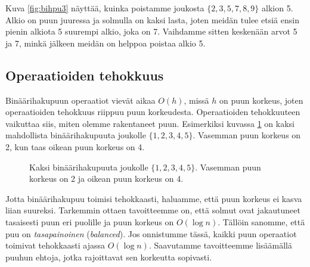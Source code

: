 Kuva \ref{fig:bihpu3} näyttää, kuinka poistamme joukosta $\{2,3,5,7,8,9\}$ alkion 5.
Alkio on puun juuressa ja solmulla on kaksi lasta,
joten meidän tulee etsiä ensin pienin alkiota 5 suurempi alkio,
joka on 7.
Vaihdamme sitten keskenään arvot 5 ja 7,
minkä jälkeen meidän on helppoa poistaa alkio 5.

\subsection{Operaatioiden tehokkuus}

Binäärihakupuun operaatiot vievät aikaa $O(h)$,
missä $h$ on puun korkeus, joten operaatioiden tehokkuus
riippuu puun korkeudesta.
Operaatioiden tehokkuuteen vaikuttaa siis,
miten olemme rakentaneet puun.
Esimerkiksi kuvassa \ref{fig:bihkor} on kaksi mahdollista
binäärihakupuuta joukolle $\{1,2,3,4,5\}$.
Vasemman puun korkeus on 2, kun taas oikean puun korkeus on 4.

\begin{figure}
\center
{}
\caption{Kaksi binäärihakupuuta joukolle $\{1,2,3,4,5\}$.
Vasemman puun korkeus on 2 ja oikean puun korkeus on 4.}
\label{fig:bihkor}
\end{figure}


Jotta binäärihakupuu toimisi tehokkaasti, haluamme,
että puun korkeus ei kasva liian suureksi.
Tarkemmin ottaen tavoitteemme on, että
solmut ovat jakautuneet tasaisesti puun eri puolille
ja puun korkeus on $O(\log n)$.
Tällöin sanomme, että puu on \emph{tasapainoinen} (\emph{balanced}).
Jos onnistumme tässä, kaikki puun operaatiot toimivat
tehokkaasti ajassa $O(\log n)$.
Saavutamme tavoitteemme
lisäämällä puuhun ehtoja, jotka rajoittavat
sen korkeutta sopivasti.

